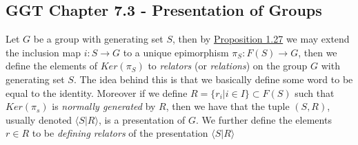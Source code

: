 \subsection{GGT Chapter 7.3 - Presentation of Groups}
Let $G$ be a group with generating set $S$, then by \hyperlink{Prop1_27}{Proposition 1.27} we may extend the inclusion map $i:S\to G$ to a unique epimorphism $\pi_S:F(S)\to G$, then we define the elements of $Ker(\pi_S)$ to \textit{relators} (or \textit{relations}) on the group $G$ with generating set $S$. The idea behind this is that we basically define some word to be equal to the identity. Moreover if we define $R=\{r_i\vert i\in I\}\subset F(S)$ such that $Ker(\pi_s)$ is \textit{normally generated} by $R$, then we have that the tuple $(S,R)$, usually denoted $\langle S\vert R\rangle$, is a presentation of $G$. We further define the elements $r\in R$ to be \textit{defining relators} of the presentation $\langle S\vert R\rangle$

